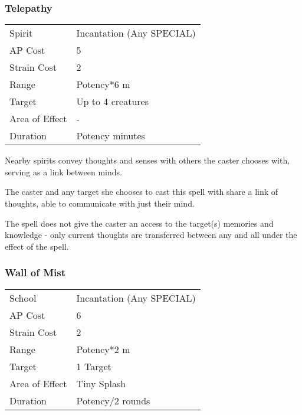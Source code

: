 \documentclass[11pt,a4paper,twocolumn]{book}
\begin{document}
\subsubsection*{Telepathy}
{
	\begin{tabu} to 75mm{| X[l,4] | X[l,7] |}
		\hline
		Spirit         & Incantation (Any SPECIAL) \\
		AP Cost        & 5                         \\
		Strain Cost    & 2                         \\
		Range          & Potency*6 m               \\
		Target         & Up to 4 creatures         \\
		Area of Effect & -                         \\
		Duration       & Potency minutes           \\ \hline
	\end{tabu}
	
}

\medskip

Nearby spirits convey thoughts and senses with others the caster chooses with, serving as a link between minds.

The caster and any target she chooses to cast this spell with share a link of thoughts, able to communicate with just their mind.

The spell does not give the caster an access to the target(s) memories and knowledge - only current thoughts are transferred between any and all under the effect of the spell.

\subsubsection*{Wall of Mist}
{
	\begin{tabu} to 75mm{| X[l,4] | X[l,7] |}
		\hline
		School         & Incantation (Any SPECIAL) \\
		AP Cost        & 6                         \\
		Strain Cost    & 2                         \\
		Range          & Potency*2 m               \\
		Target         & 1 Target                  \\
		Area of Effect & Tiny Splash               \\
		Duration       & Potency/2 rounds          \\ \hline
	\end{tabu}
	
}
\end{document}
